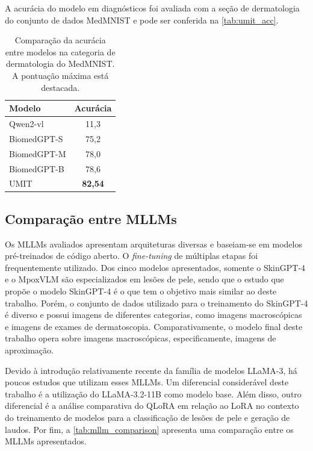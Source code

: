 A acurácia do modelo em diagnósticos foi avaliada com a seção de dermatologia do conjunto de dados MedMNIST e pode ser
conferida na \autoref{tab:umit_acc}.

\clearpage

\begin{table}[ht]
    \caption{\small Comparação da acurácia entre modelos na categoria de dermatologia do MedMNIST. A pontuação máxima
    está destacada.}
    \centering
    \begin{tabular}{l|c}
        \hline
        Modelo      & Acurácia       \\ \hline
        Qwen2-vl    & 11,3           \\
        BiomedGPT-S & 75,2           \\
        BiomedGPT-M & 78,0           \\
        BiomedGPT-B & 78,6           \\ \hline
        UMIT        & \textbf{82,54} \\ \hline
    \end{tabular}
    \label{tab:umit_acc}
\end{table}

\subsection{Comparação entre MLLMs}

Os \acp{MLLM} avaliados apresentam arquiteturas diversas e baseiam-se em modelos pré-treinados de código aberto. O
\textit{fine-tuning} de múltiplas etapas foi frequentemente utilizado. Dos cinco modelos apresentados, somente o
Skin\ac{GPT}-4 e o MpoxVLM são especializados em lesões de pele, sendo que o estudo que propõe o modelo Skin\ac{GPT}-4
é o que tem o objetivo mais similar ao deste trabalho. Porém, o conjunto de dados utilizado para o treinamento do
Skin\ac{GPT}-4 é diverso e possui imagens de diferentes categorias, como imagens macroscópicas e imagens de exames de
dermatoscopia. Comparativamente, o modelo final deste trabalho opera sobre imagens macroscópicas, especificamente,
imagens de aproximação.

Devido à introdução relativamente recente da família de modelos \ac{LLaMA}-3, há poucos estudos que utilizam esses
\acp{MLLM}. Um diferencial considerável deste trabalho é a utilização do \ac{LLaMA}-3.2-11B como modelo base. Além
disso, outro diferencial é a análise comparativa do \ac{QLoRA} em relação ao \ac{LoRA} no contexto do treinamento de
modelos para a classificação de lesões de pele e geração de laudos. Por fim, a \autoref{tab:mllm_comparison} apresenta
uma comparação entre os \acp{MLLM} apresentados.

